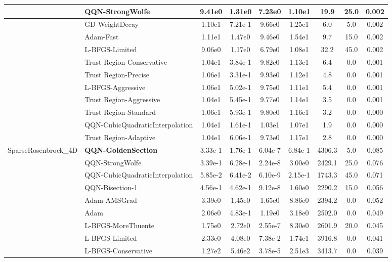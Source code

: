 \documentclass{article}
\begin{document}
\begin{longtable}{|l|l|c|c|c|c|c|c|c|}
\hline
 & QQN-StrongWolfe & 9.41e0 & 1.31e0 & 7.23e0 & 1.10e1 & 19.9 & 25.0 & 0.002 \\
\hline
 & GD-WeightDecay & 1.10e1 & 7.21e-1 & 9.66e0 & 1.25e1 & 6.0 & 5.0 & 0.002 \\
\hline
 & Adam-Fast & 1.11e1 & 1.47e0 & 9.46e0 & 1.54e1 & 9.7 & 15.0 & 0.002 \\
\hline
 & L-BFGS-Limited & 9.06e0 & 1.17e0 & 6.79e0 & 1.08e1 & 32.2 & 45.0 & 0.002 \\
\hline
 & Trust Region-Conservative & 1.04e1 & 3.84e-1 & 9.82e0 & 1.13e1 & 6.4 & 0.0 & 0.001 \\
\hline
 & Trust Region-Precise & 1.06e1 & 3.31e-1 & 9.93e0 & 1.12e1 & 4.8 & 0.0 & 0.001 \\
\hline
 & L-BFGS-Aggressive & 1.06e1 & 5.02e-1 & 9.75e0 & 1.11e1 & 5.4 & 0.0 & 0.001 \\
\hline
 & Trust Region-Aggressive & 1.04e1 & 5.45e-1 & 9.77e0 & 1.14e1 & 3.5 & 0.0 & 0.001 \\
\hline
 & Trust Region-Standard & 1.06e1 & 5.93e-1 & 9.80e0 & 1.16e1 & 3.2 & 0.0 & 0.000 \\
\hline
 & QQN-CubicQuadraticInterpolation & 1.04e1 & 1.61e-1 & 1.03e1 & 1.07e1 & 1.9 & 0.0 & 0.000 \\
\hline
 & Trust Region-Adaptive & 1.04e1 & 6.06e-1 & 9.73e0 & 1.17e1 & 2.8 & 0.0 & 0.000 \\
SparseRosenbrock\_4D & \textbf{QQN-GoldenSection} & 3.33e-1 & 1.76e-1 & 6.04e-7 & 6.84e-1 & 4306.3 & 5.0 & 0.085 \\
\hline
 & QQN-StrongWolfe & 3.39e-1 & 6.28e-1 & 2.24e-8 & 3.00e0 & 2429.1 & 25.0 & 0.076 \\
\hline
 & QQN-CubicQuadraticInterpolation & 5.85e-2 & 6.41e-2 & 6.10e-9 & 2.15e-1 & 1743.3 & 45.0 & 0.071 \\
\hline
 & QQN-Bisection-1 & 4.56e-1 & 4.62e-1 & 9.12e-8 & 1.60e0 & 2290.2 & 15.0 & 0.056 \\
\hline
 & Adam-AMSGrad & 3.39e0 & 1.45e0 & 1.65e0 & 8.86e0 & 2394.2 & 0.0 & 0.052 \\
\hline
 & Adam & 2.06e0 & 4.83e-1 & 1.19e0 & 3.18e0 & 2502.0 & 0.0 & 0.049 \\
\hline
 & L-BFGS-MoreThuente & 1.75e0 & 2.72e0 & 2.55e-7 & 8.30e0 & 2601.9 & 20.0 & 0.045 \\
\hline
 & L-BFGS-Limited & 2.33e0 & 4.08e0 & 7.38e-2 & 1.74e1 & 3916.8 & 0.0 & 0.041 \\
\hline
 & L-BFGS-Conservative & 1.27e2 & 5.46e2 & 3.78e-5 & 2.51e3 & 3413.7 & 0.0 & 0.039 \\

\end{longtable}
\end{document}
